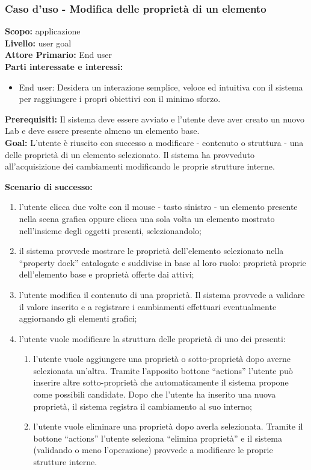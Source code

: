 \begin{flushleft}
\begin{boxedminipage}{\textwidth}

\subsubsection*{Caso d'uso - Modifica delle proprietà di un elemento}

\textbf{Scopo:} applicazione \visualnetkit{} \\
\textbf{Livello:} user goal \\
\textbf{Attore Primario:} End user \\
\textbf{Parti interessate e interessi:}
\begin{itemize}
\item End user: Desidera un interazione semplice, veloce ed intuitiva con il sistema per raggiungere i propri obiettivi con il minimo sforzo.
\end{itemize}

\textbf{Prerequisiti:} Il sistema deve essere avviato e l'utente deve aver creato un nuovo Lab e deve essere presente almeno un elemento base. \\
\textbf{Goal:} L'utente è riuscito con successo a modificare - contenuto o struttura - una delle proprietà di un elemento selezionato. Il sistema ha provveduto all'acquisizione dei cambiamenti modificando le proprie strutture interne.

\textbf{Scenario di successo:}
\begin{enumerate}
\item l'utente clicca due volte con il mouse - tasto sinistro - un elemento presente nella scena grafica oppure clicca una sola volta un elemento mostrato nell'insieme degli oggetti presenti, selezionandolo;
\item il sistema provvede mostrare le proprietà dell'elemento selezionato nella ``property dock'' catalogate e suddivise in base al loro ruolo: proprietà proprie dell'elemento base e proprietà offerte dai \plugin{} attivi;
\item l'utente modifica il contenuto di una proprietà. Il sistema provvede a validare il valore inserito e a registrare i cambiamenti effettuari eventualmente aggiornando gli elementi grafici;
\item l'utente vuole modificare la struttura delle proprietà di uno dei \plugin{} presenti:
	\begin{enumerate}
	\item l'utente vuole aggiungere una proprietà o sotto-proprietà dopo averne selezionata un'altra. Tramite l'apposito bottone ``actions'' l'utente può inserire altre sotto-proprietà che automaticamente il sistema propone come possibili candidate. Dopo che l'utente ha inserito una nuova proprietà, il sistema registra il cambiamento al suo interno;
	\item l'utente vuole eliminare una proprietà dopo averla selezionata. Tramite il bottone ``actions'' l'utente seleziona ``elimina proprietà'' e il sistema (validando o meno l'operazione) provvede a modificare le proprie strutture interne.
	\end{enumerate}
\end{enumerate}


\end{boxedminipage}
\end{flushleft}
